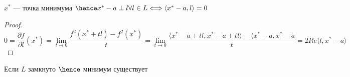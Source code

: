 \begin{example}
\begin{tikzpicture}[x=0.75pt,y=0.75pt,yscale=-1,xscale=1]
\end{tikzpicture}

\begin{statement}
    $x^* $ --- точка минимума $\hence x^* - a \perp l \forall l \in L \Longleftrightarrow \langle x^* - a , l \rangle = 0 $ 
\end{statement}

\begin{proof}
    \[ 
        0 = \frac{\partial f}{\partial l}(x^*) = \lim_{t \to 0} \frac{f^2(x^* + tl) - f^2(x^*)}{t} = \lim_{t \to 0} \frac{\langle x^* - a + tl, x^* - a + tl \rangle - \langle x^* - a, x^ * - a}{t}  = 2 Re \langle l, x ^ * - a \rangle
    \]
\end{proof}

\end{example}


\begin{exercise}
    Если $L$ замкнуто $\hence$ минимум существует
\end{exercise}


